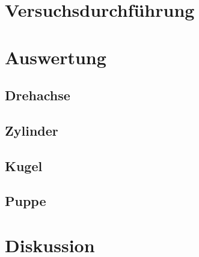 \section{Versuchsdurchführung}\justifying

\section{Auswertung}\justifying

\subsection{Drehachse}\justifying

\subsection{Zylinder}\justifying

\subsection{Kugel}\justifying

\subsection{Puppe}\justifying

\section{Diskussion}\justifying

\newpage

\printbibliography
